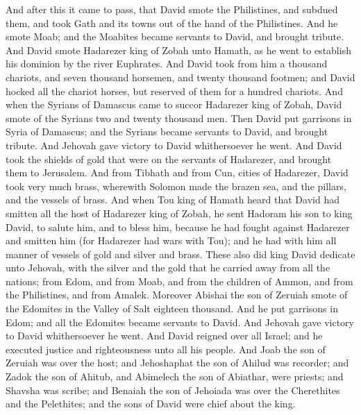 And after this it came to pass, that David smote the Philistines, and subdued them, and took Gath and its towns out of the hand of the Philistines. And he smote Moab; and the Moabites became servants to David, and brought tribute.  And David smote Hadarezer king of Zobah unto Hamath, as he went to establish his dominion by the river Euphrates. And David took from him a thousand chariots, and seven thousand horsemen, and twenty thousand footmen; and David hocked all the chariot horses, but reserved of them for a hundred chariots.  And when the Syrians of Damascus came to succor Hadarezer king of Zobah, David smote of the Syrians two and twenty thousand men. Then David put garrisons in Syria of Damascus; and the Syrians became servants to David, and brought tribute. And Jehovah gave victory to David whithersoever he went. And David took the shields of gold that were on the servants of Hadarezer, and brought them to Jerusalem. And from Tibhath and from Cun, cities of Hadarezer, David took very much brass, wherewith Solomon made the brazen sea, and the pillars, and the vessels of brass.  And when Tou king of Hamath heard that David had smitten all the host of Hadarezer king of Zobah, he sent Hadoram his son to king David, to salute him, and to bless him, because he had fought against Hadarezer and smitten him (for Hadarezer had wars with Tou); and he had with him all manner of vessels of gold and silver and brass. These also did king David dedicate unto Jehovah, with the silver and the gold that he carried away from all the nations; from Edom, and from Moab, and from the children of Ammon, and from the Philistines, and from Amalek.  Moreover Abishai the son of Zeruiah smote of the Edomites in the Valley of Salt eighteen thousand. And he put garrisons in Edom; and all the Edomites became servants to David. And Jehovah gave victory to David whithersoever he went.  And David reigned over all Israel; and he executed justice and righteousness unto all his people. And Joab the son of Zeruiah was over the host; and Jehoshaphat the son of Ahilud was recorder; and Zadok the son of Ahitub, and Abimelech the son of Abiathar, were priests; and Shavsha was scribe; and Benaiah the son of Jehoiada was over the Cherethites and the Pelethites; and the sons of David were chief about the king. 

